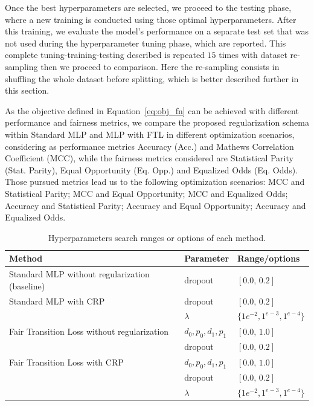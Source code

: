 Once the best hyperparameters are selected, we proceed to the testing phase, where a new training is conducted using those optimal hyperparameters. After this training, we evaluate the model's performance on a separate test set that was not used during the hyperparameter tuning phase, which are reported. This complete tuning-training-testing described is repeated $15$ times with dataset re-sampling then we proceed to comparison. Here the re-sampling consists in shuffling the whole dataset before splitting, which is better described further in this section.

As the objective defined in Equation~\ref{eq:obj_fn} can be achieved with different performance and fairness metrics, we compare the proposed regularization schema within Standard MLP and MLP with FTL in different optimization scenarios, considering as performance metrics Accuracy (Acc.) and Mathews Correlation Coefficient (MCC), while the fairness metrics considered are Statistical Parity (Stat. Parity), Equal Opportunity (Eq. Opp.) and Equalized Odds (Eq. Odds). Those pursued metrics lead us to the following optimization scenarios: MCC and Statistical Parity; MCC and Equal Opportunity; MCC and Equalized Odds; Accuracy and Statistical Parity; Accuracy and Equal Opportunity; Accuracy and Equalized Odds.

\begin{table}[ht]
\centering
\caption{Hyperparameters search ranges or options of each method.}\label{tab:hyperparameters_crp}
{\footnotesize
\begin{tabular}{lll}
\toprule
Method & Parameter & Range/options \\ \midrule
 Standard MLP without regularization (baseline) & dropout & $[0.0,\,0.2]$  \vspace{1ex} \\
 Standard MLP with CRP & dropout & $[0.0,\,0.2]$  \vspace{1ex} \\
 & $\lambda$ & $\{1e^{-2}, 1^{e-3}, 1^{e-4}\}$ \\
 Fair Transition Loss without regularization & $d_0,p_0,d_1,p_1$ & $[0.0,\,1.0]$ \\
 &  dropout & $[0.0,\,0.2]$ \\
 Fair Transition Loss with CRP & $d_0,p_0,d_1,p_1$ & $[0.0,\,1.0]$ \\
 &  dropout & $[0.0,\,0.2]$ \\
 & $\lambda$ & $\{1e^{-2}, 1^{e-3}, 1^{e-4}\}$ \\
\bottomrule
\end{tabular}
}
\end{table}

